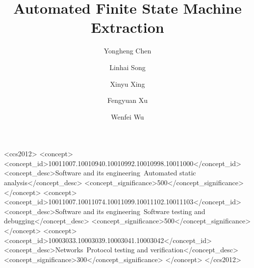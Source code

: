 \documentclass[sigconf]{acmart}
\begin{document}
\fancyhead{}

\title{Automated Finite State Machine Extraction}



\author{Yongheng Chen}

\author{Linhai Song}

\author{Xinyu Xing}

\author{Fengyuan Xu}

\author{Wenfei Wu}



\def\ie{\emph{i.e.}}
\def\eg{\emph{e.g.}}

\newcommand{\hpad}[0]{\hspace*{\fill}}

\newcommand{\Tool}{FSMExtractor}

\newcommand{\Thrust}[1]{\hyperref[sec:thrust-#1]{Thrust #1}}
\newcommand{\Code}[1]{\lstinline{#1}}
%
\begin{abstract}

\end{abstract}

%
%
\begin{CCSXML}
<ccs2012>
<concept>
<concept_id>10011007.10010940.10010992.10010998.10011000</concept_id>
<concept_desc>Software and its engineering~Automated static analysis</concept_desc>
<concept_significance>500</concept_significance>
</concept>
<concept>
<concept_id>10011007.10011074.10011099.10011102.10011103</concept_id>
<concept_desc>Software and its engineering~Software testing and debugging</concept_desc>
<concept_significance>500</concept_significance>
</concept>
<concept>
<concept_id>10003033.10003039.10003041.10003042</concept_id>
<concept_desc>Networks~Protocol testing and verification</concept_desc>
<concept_significance>300</concept_significance>
</concept>
</ccs2012>
\end{CCSXML}
\end{document}
